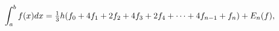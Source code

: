 \[\int_{a}^{b}f(x)dx=\tfrac{1}{3}h(f_{0}+4f_{1}+2f_{2}+4f_{3}+2f_{4}+\cdots+4f_{%
n-1}+f_{n})+E_{n}(f),\]